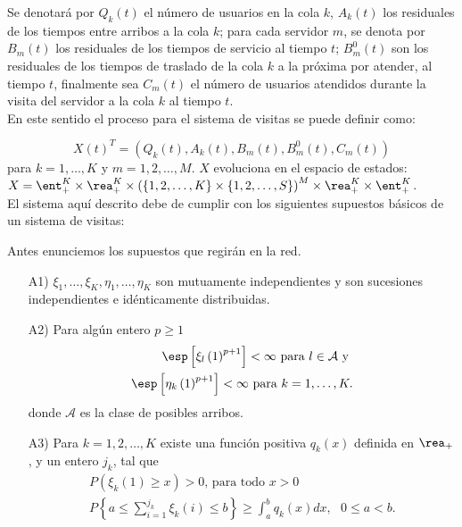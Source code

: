 Se denotar\'a por $Q_{k}\left(t\right)$ el n\'umero de usuarios en la cola $k$,
$A_{k}\left(t\right)$ los residuales de los tiempos entre arribos a la cola $k$;
para cada servidor $m$, se denota por $B_{m}\left(t\right)$ los residuales de los tiempos de servicio al tiempo $t$; $B_{m}^{0}\left(t\right)$ son los residuales de los tiempos de traslado de la cola $k$ a la pr\'oxima por atender, al tiempo $t$, finalmente sea $C_{m}\left(t\right)$ el n\'umero de usuarios atendidos durante la visita del servidor a la cola $k$ al tiempo $t$.\\


En este sentido el proceso para el sistema de visitas se puede definir como:

\begin{equation}\label{Esp.Edos.Down}
X\left(t\right)^{T}=\left(Q_{k}\left(t\right),A_{k}\left(t\right),B_{m}\left(t\right),B_{m}^{0}\left(t\right),C_{m}\left(t\right)\right)
\end{equation}
para $k=1,\ldots,K$ y $m=1,2,\ldots,M$. $X$ evoluciona en el
espacio de estados:
$X=\ent_{+}^{K}\times\rea_{+}^{K}\times\left(\left\{1,2,\ldots,K\right\}\times\left\{1,2,\ldots,S\right\}\right)^{M}\times\rea_{+}^{K}\times\ent_{+}^{K}$.\\

El sistema aqu\'i descrito debe de cumplir con los siguientes supuestos b\'asicos de un sistema de visitas:

Antes enunciemos los supuestos que regir\'an en la red.

\begin{itemize}
\item[A1)] $\xi_{1},\ldots,\xi_{K},\eta_{1},\ldots,\eta_{K}$ son
mutuamente independientes y son sucesiones independientes e
id\'enticamente distribuidas.

\item[A2)] Para alg\'un entero $p\geq1$
\begin{eqnarray*}
\esp\left[\xi_{l}\left(1\right)^{p+1}\right]<\infty\textrm{ para }l\in\mathcal{A}\textrm{ y }\\
\esp\left[\eta_{k}\left(1\right)^{p+1}\right]<\infty\textrm{ para
}k=1,\ldots,K.
\end{eqnarray*}
donde $\mathcal{A}$ es la clase de posibles arribos.

\item[A3)] Para $k=1,2,\ldots,K$ existe una funci\'on positiva
$q_{k}\left(x\right)$ definida en $\rea_{+}$, y un entero $j_{k}$,
tal que
\begin{eqnarray}
P\left(\xi_{k}\left(1\right)\geq x\right)>0\textrm{, para todo }x>0\\
P\left\{a\leq\sum_{i=1}^{j_{k}}\xi_{k}\left(i\right)\leq
b\right\}\geq\int_{a}^{b}q_{k}\left(x\right)dx, \textrm{ }0\leq
a<b.
\end{eqnarray}
\end{itemize}

